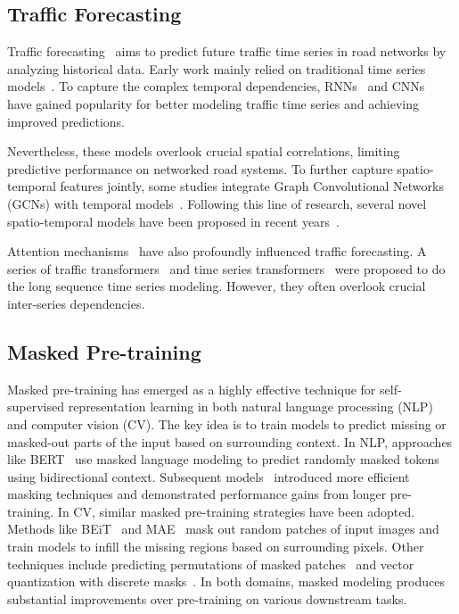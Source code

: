 \documentclass[letterpaper]{article} \usepackage{aaai24}  \usepackage{times}  \usepackage{helvet}  \usepackage{courier}  \usepackage[hyphens]{url}  \usepackage{graphicx} \urlstyle{rm} \def\UrlFont{\rm}  \usepackage{natbib}  \usepackage{caption} \frenchspacing  \setlength{\pdfpagewidth}{8.5in} \setlength{\pdfpageheight}{11in} \usepackage{algorithm}
\begin{document}
\subsection{Traffic Forecasting}
Traffic forecasting~\cite{jiang2021dl} aims to predict future traffic time series in road networks by analyzing historical data. Early work mainly relied on traditional time series models~\cite{pan2012utilizing, stock2001vector}. To capture the complex temporal dependencies, RNNs~\cite{hochreiter1997long, chung2014empirical, ma2015long, lv2018lc} and CNNs~\cite{oord2016wavenet} have gained popularity for better modeling traffic time series and achieving improved predictions.

Nevertheless, these models overlook crucial spatial correlations, limiting predictive performance on networked road systems. To further capture spatio-temporal features jointly, some studies integrate Graph Convolutional Networks (GCNs) with temporal models~\cite{yu2018spatio, li2018diffusion, zhao2019t}. Following this line of research, several novel spatio-temporal models have been proposed in recent years~\cite{wu2019graph, xu2020spatial, bai2020adaptive, cao2020spectral, wu2020connecting, guo2021hierarchical, han2021dynamic, lee2021learning, jiang2023spatio}. 

Attention mechanisms~\cite{vaswani2017attention} have also profoundly influenced traffic forecasting. A series of traffic transformers~\cite{zheng2020gman, xu2020spatial, jiang2023pdformer} and time series transformers~\cite{zhou2021informer, xu2021autoformer, liu2021pyraformer, zhou2022fedformer} were proposed to do the long sequence time series modeling. However, they often overlook crucial inter-series dependencies.

\subsection{Masked Pre-training} 
Masked pre-training has emerged as a highly effective technique for self-supervised representation learning in both natural language processing (NLP) and computer vision (CV). The key idea is to train models to predict missing or masked-out parts of the input based on surrounding context. In NLP, approaches like BERT~\cite{kenton2019bert} use masked language modeling to predict randomly masked tokens using bidirectional context. Subsequent models~\cite{liu2019roberta, lan2019albert, clark2020electra} introduced more efficient masking techniques and demonstrated performance gains from longer pre-training. In CV, similar masked pre-training strategies have been adopted. Methods like BEiT~\cite{bao2021beit} and MAE~\cite{he2022masked} mask out random patches of input images and train models to infill the missing regions based on surrounding pixels. Other techniques include predicting permutations of masked patches~\cite{xie2022simmim} and vector quantization with discrete masks~\cite{van2017neural}. In both domains, masked modeling produces substantial improvements over pre-training on various downstream tasks.
\end{document}
